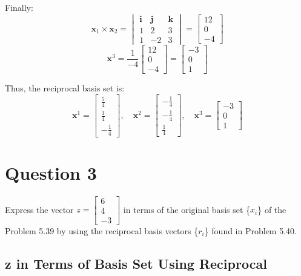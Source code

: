 \documentclass{article}
\begin{document}
Finally:
\[
\mathbf{x}_1 \times \mathbf{x}_2 = \begin{vmatrix}
\mathbf{i} & \mathbf{j} & \mathbf{k} \\
1 & 2 & 3 \\
1 & -2 & 3
\end{vmatrix}
= \begin{bmatrix} 12 \\ 0 \\ -4 \end{bmatrix}
\]
\[
\mathbf{x}^3 = \frac{1}{-4} \begin{bmatrix} 12 \\ 0 \\ -4 \end{bmatrix} = \begin{bmatrix} -3 \\ 0 \\ 1 \end{bmatrix}
\]

Thus, the reciprocal basis set is:
\[
\mathbf{x}^1 = \begin{bmatrix} \frac{5}{4} \\ \frac{1}{4} \\ -\frac{1}{4} \end{bmatrix}, \quad
\mathbf{x}^2 = \begin{bmatrix} -\frac{1}{4} \\ -\frac{1}{4} \\ \frac{1}{4} \end{bmatrix}, \quad
\mathbf{x}^3 = \begin{bmatrix} -3 \\ 0 \\ 1 \end{bmatrix}
\]

\section{Question 3}

Express the vector $z = \begin{bmatrix} 6 \\ 4 \\ -3 \end{bmatrix}$ in terms of the original basis set \{$x_i$\} of the Problem 5.39 by using the reciprocal basis vectors \{$r_i$\} found in Problem 5.40.

\subsection{z in Terms of Basis Set Using Reciprocal}
\end{document}
